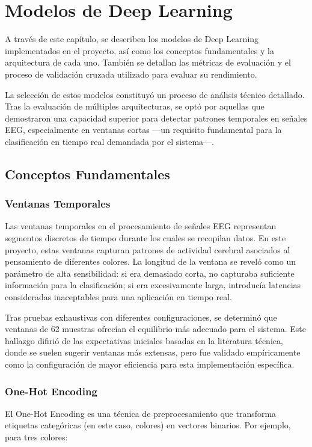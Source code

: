 \chapter{Modelos de Deep Learning}\label{ch:deep_learning_models}

A través de este capítulo, se describen los modelos de Deep Learning \cite{raschka2022machine} implementados en el proyecto, así como los conceptos fundamentales y la arquitectura de cada uno. También se detallan las métricas de evaluación y el proceso de validación cruzada utilizado para evaluar su rendimiento.

La selección de estos modelos constituyó un proceso de análisis técnico detallado. Tras la evaluación de múltiples arquitecturas, se optó por aquellas que demostraron una capacidad superior para detectar patrones temporales en señales EEG, especialmente en ventanas cortas —un requisito fundamental para la clasificación en tiempo real demandada por el sistema—.

\section{Conceptos Fundamentales}

\subsection{Ventanas Temporales}
Las ventanas temporales en el procesamiento de señales EEG representan segmentos discretos de tiempo durante los cuales se recopilan datos. En este proyecto, estas ventanas capturan patrones de actividad cerebral asociados al pensamiento de diferentes colores. La longitud de la ventana se reveló como un parámetro de alta sensibilidad: si era demasiado corta, no capturaba suficiente información para la clasificación; si era excesivamente larga, introducía latencias consideradas inaceptables para una aplicación en tiempo real.

Tras pruebas exhaustivas con diferentes configuraciones, se determinó que ventanas de 62 muestras ofrecían el equilibrio más adecuado para el sistema. Este hallazgo difirió de las expectativas iniciales basadas en la literatura técnica, donde se suelen sugerir ventanas más extensas, pero fue validado empíricamente como la configuración de mayor eficiencia para esta implementación específica.

\subsection{One-Hot Encoding}
El One-Hot Encoding \cite{raschka2022machine} es una técnica de preprocesamiento que transforma etiquetas categóricas (en este caso, colores) en vectores binarios. Por ejemplo, para tres colores:

